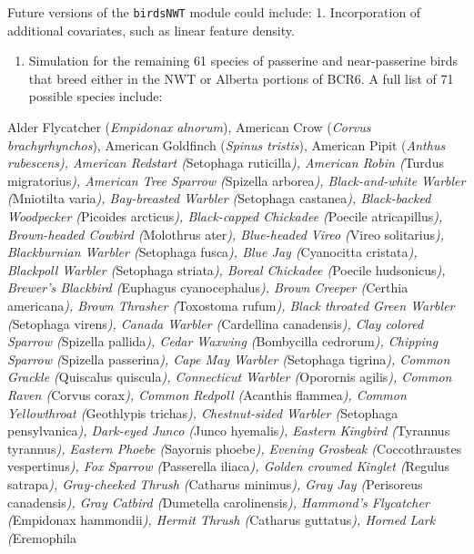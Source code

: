 \documentclass[]{article}
\providecommand{\tightlist}{%
  \setlength{\itemsep}{0pt}\setlength{\parskip}{0pt}}
\begin{document}
Future versions of the \texttt{birdsNWT} module could include: 1.
Incorporation of additional covariates, such as linear feature density.

\begin{enumerate}
\def\labelenumi{\arabic{enumi}.}
\setcounter{enumi}{1}
\tightlist
\item
  Simulation for the remaining 61 species of passerine and
  near-passerine birds that breed either in the NWT or Alberta portions
  of BCR6. A full list of 71 possible species include:
\end{enumerate}

Alder Flycatcher (\emph{Empidonax alnorum}), American Crow (\emph{Corvus
brachyrhynchos}), American Goldfinch (\emph{Spinus tristis}), American
Pipit (\emph{Anthus rubescens), American Redstart (}Setophaga
ruticilla\emph{), American Robin (}Turdus migratorius\emph{), American
Tree Sparrow (}Spizella arborea\emph{), Black-and-white Warbler
(}Mniotilta varia\emph{), Bay-breasted Warbler (}Setophaga
castanea\emph{), Black-backed Woodpecker (}Picoides arcticus\emph{),
Black-capped Chickadee (}Poecile atricapillus\emph{), Brown-headed
Cowbird (}Molothrus ater\emph{), Blue-headed Vireo (}Vireo
solitarius\emph{), Blackburnian Warbler (}Setophaga fusca\emph{), Blue
Jay (}Cyanocitta cristata\emph{), Blackpoll Warbler (}Setophaga
striata\emph{), Boreal Chickadee (}Poecile hudsonicus\emph{), Brewer's
Blackbird (}Euphagus cyanocephalus\emph{), Brown Creeper (}Certhia
americana\emph{), Brown Thrasher (}Toxostoma rufum\emph{), Black
throated Green Warbler (}Setophaga virens\emph{), Canada Warbler
(}Cardellina canadensis\emph{), Clay colored Sparrow (}Spizella
pallida\emph{), Cedar Waxwing (}Bombycilla cedrorum\emph{), Chipping
Sparrow (}Spizella passerina\emph{), Cape May Warbler (}Setophaga
tigrina\emph{), Common Grackle (}Quiscalus quiscula\emph{), Connecticut
Warbler (}Oporornis agilis\emph{), Common Raven (}Corvus corax\emph{),
Common Redpoll (}Acanthis flammea\emph{), Common Yellowthroat
(}Geothlypis trichas\emph{), Chestnut-sided Warbler (}Setophaga
pensylvanica\emph{), Dark-eyed Junco (}Junco hyemalis\emph{), Eastern
Kingbird (}Tyrannus tyrannus\emph{), Eastern Phoebe (}Sayornis
phoebe\emph{), Evening Grosbeak (}Coccothraustes vespertinus\emph{), Fox
Sparrow (}Passerella iliaca\emph{), Golden crowned Kinglet (}Regulus
satrapa\emph{), Gray-cheeked Thrush (}Catharus minimus\emph{), Gray Jay
(}Perisoreus canadensis\emph{), Gray Catbird (}Dumetella
carolinensis\emph{), Hammond's Flycatcher (}Empidonax hammondii\emph{),
Hermit Thrush (}Catharus guttatus\emph{), Horned Lark (}Eremophila
\end{document}
